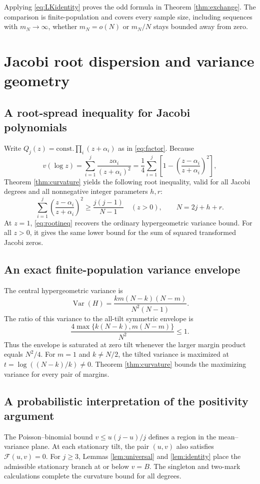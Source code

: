 \documentclass[11pt,a4paper]{article}
\DeclareMathOperator{\Var}{Var}\DeclareMathOperator{\Cov}{Cov}\DeclareMathOperator{\Hyp}{Hyp}\DeclareMathOperator{\Bern}{Bern}\DeclareMathOperator{\supp}{supp}\DeclareMathOperator{\artanh}{artanh}
\begin{document}
Applying \eqref{eq:LKidentity} proves the odd formula in Theorem \ref{thm:exchange}. The comparison is finite-population and covers every sample size, including sequences with $m_N\to\infty$, whether $m_N=o(N)$ or $m_N/N$ stays bounded away from zero.


\section{Jacobi root dispersion and variance geometry}\label{sec:structure}
\subsection{A root-spread inequality for Jacobi polynomials}
Write $Q_j(z)=\text{const.}\prod_i(z+\alpha_i)$ as in \eqref{eq:factor}. Because
\[
 v(\log z)=\sum_{i=1}^j\frac{z\alpha_i}{(z+\alpha_i)^2}
 =\frac14\sum_{i=1}^j\left[1-\left(\frac{z-\alpha_i}{z+\alpha_i}\right)^2\right],
\]
Theorem \ref{thm:curvature} yields the following root inequality, valid for all Jacobi degrees and all nonnegative integer parameters $h,r$:
\begin{equation}\label{eq:rootineq}
 \boxed{\quad
 \sum_{i=1}^j\left(\frac{z-\alpha_i}{z+\alpha_i}\right)^2
 \ge\frac{j(j-1)}{N-1}
 \quad(z>0),\qquad N=2j+h+r.\quad}
\end{equation}
At $z=1$, \eqref{eq:rootineq} recovers the ordinary hypergeometric variance bound. For all $z>0$, it gives the same lower bound for the sum of squared transformed Jacobi zeros.

\subsection{An exact finite-population variance envelope}
The central hypergeometric variance is
\[
 \Var(H)=\frac{km(N-k)(N-m)}{N^2(N-1)}.
\]
The ratio of this variance to the all-tilt symmetric envelope is
\[
 \frac{4\max\{k(N-k),m(N-m)\}}{N^2}\le1.
\]
Thus the envelope is saturated at zero tilt whenever the larger margin product equals $N^2/4$. For $m=1$ and $k\ne N/2$, the tilted variance is maximized at $t=\log((N-k)/k)\ne0$. Theorem \ref{thm:curvature} bounds the maximizing variance for every pair of margins.

\subsection{A probabilistic interpretation of the positivity argument}
The Poisson--binomial bound $v\le u(j-u)/j$ defines a region in the mean--variance plane. At each stationary tilt, the pair $(u,v)$ also satisfies $\mathcal F(u,v)=0$. For $j\ge3$, Lemmas \ref{lem:universal} and \ref{lem:identity} place the admissible stationary branch at or below $v=B$. The singleton and two-mark calculations complete the curvature bound for all degrees.
\end{document}
